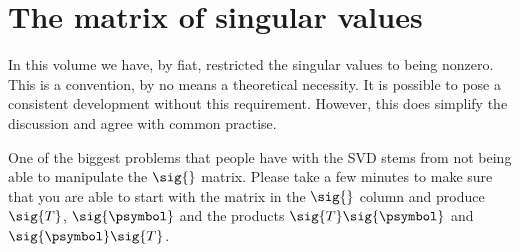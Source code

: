 \section{The matrix of singular values}

In this volume we have, by fiat, restricted the singular values to being nonzero. This is a convention, by no means a theoretical necessity. It is possible to pose a consistent development without this requirement. However, this does simplify the discussion and agree with common practise.

One of the biggest problems that people have with the SVD stems from not being able to manipulate the $\sig{}$ matrix. Please take a few minutes to make sure that you are able to start with the matrix in the $\sig{}$ column and produce $\sig{T}$, $\sig{\psymbol}$ and the products $\sig{T}\sig{\psymbol}$ and $\sig{\psymbol}\sig{T}$.

